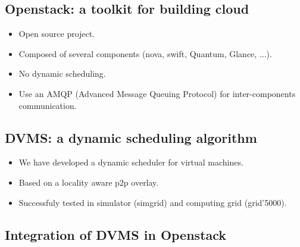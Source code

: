 \subsection{Openstack: a toolkit for building cloud}

\begin{itemize}

	\item Open source project.

	\item Composed of several components (nova, swift, Quantum, Glance, ...).

	\item No dynamic scheduling.

	\item Use an AMQP (Advanced Message Queuing Protocol) for inter-components communication.

\end{itemize}



\subsection{DVMS: a dynamic scheduling algorithm}

\begin{itemize}

	\item We have developed a dynamic scheduler for virtual machines.

	\item Based on a locality aware p2p overlay.

	\item Successfuly tested in simulator (simgrid) and computing grid (grid'5000).

\end{itemize}


\subsection{Integration of DVMS in Openstack}

